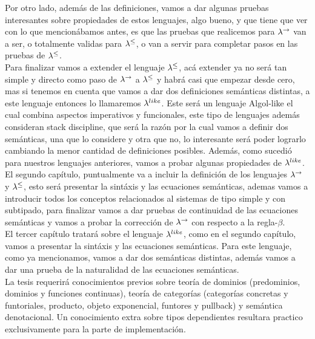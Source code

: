 Por otro lado, adem\'as de las definiciones, vamos a dar algunas pruebas
interesantes sobre propiedades de estos lenguajes, algo bueno, y que tiene
que ver con lo que mencion\'abamos antes, es que las pruebas que realicemos
para $\lambda^{\rightarrow}$ van a ser, o totalmente validas para $\lambda^{\leq}$, o
van a servir para completar pasos en las pruebas de $\lambda^{\leq}$.\\

Para finalizar vamos a extender el lenguaje $\lambda^{\leq}$, ac\'a extender
ya no ser\'a tan simple y directo como paso de $\lambda^{\rightarrow}$ a $\lambda^{\leq}$
y habr\'a casi que empezar desde cero, mas si tenemos en cuenta que vamos a
dar dos definiciones sem\'anticas distintas, a este lenguaje entonces lo 
llamaremos $\lambda^{like}$. Este ser\'a un lenguaje Algol-like el cual
combina aspectos imperativos y funcionales, este tipo de lenguajes adem\'as
consideran stack discipline, que ser\'a la raz\'on por la cual vamos a
definir dos sem\'anticas, una que lo considere y otra
que no, lo interesante ser\'a poder lograrlo cambiando la menor
cantidad de definiciones posibles. Adem\'as, como sucedi\'o para nuestros
lenguajes anteriores, vamos a probar algunas propiedades de $\lambda^{like}$.\\

El segundo cap\'itulo, puntualmente va a incluir la definici\'on de los lenguajes
$\lambda^{\rightarrow}$ y $\lambda^{\leq}$, esto ser\'a presentar la sint\'axis y las ecuaciones
sem\'anticas, ademas vamos a introducir todos los conceptos relacionados al 
sistemas de tipo simple y con subtipado, para finalizar vamos a dar pruebas de
continuidad de las ecuaciones sem\'anticas y vamos a probar la correcci\'on
de $\lambda^{\rightarrow}$ con respecto a la regla-$\beta$.\\

El tercer cap\'itulo tratar\'a sobre el lenguaje $\lambda^{like}$, como en el segundo
cap\'itulo, vamos a presentar la sint\'axis y las ecuaciones sem\'anticas. Para
este lenguaje, como ya mencionamos, vamos a dar dos sem\'anticas distintas, adem\'as
vamos a dar una prueba de la naturalidad de las ecuaciones sem\'anticas.\\

La tesis requerir\'a conocimientos previos sobre teor\'ia de dominios 
(predominios, dominios y funciones continuas), teor\'ia
de categor\'ias (categor\'ias concretas y funtoriales, producto, 
objeto exponencial, funtores y pullback) y sem\'antica denotacional. Un
conocimiento extra sobre tipos dependientes resultara practico exclusivamente
para la parte de implementaci\'on.
